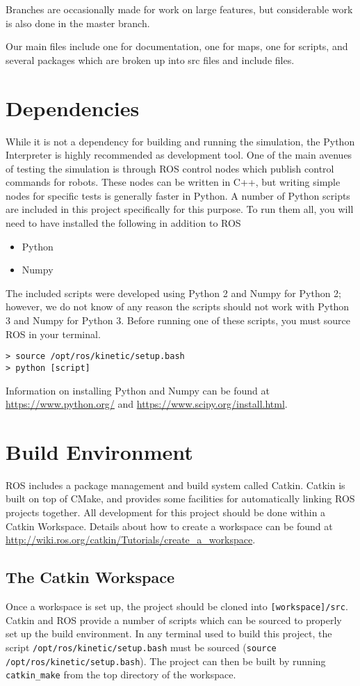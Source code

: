 Branches are occasionally made for work on large features, but considerable work is also done in the master branch.

Our main files include one for documentation, one for maps, one for scripts, and several packages which are broken up into src files and include files.

\section{Dependencies}
While it is not a dependency for building and running the simulation, the Python Interpreter is highly recommended as development tool. One of the main avenues of testing the simulation is through ROS control nodes which publish control commands for robots. These nodes can be written in C++, but writing simple nodes for specific tests is generally faster in Python. A number of Python scripts are included in this project specifically for this purpose. To run them all, you will need to have installed the following in addition to ROS
\begin{itemize}
	\item Python
	\item Numpy
\end{itemize}
The included scripts were developed using Python 2 and Numpy for Python 2; however, we do not know of any reason the scripts should not work with Python 3 and Numpy for Python 3.
Before running one of these scripts, you must source ROS in your terminal.
\begin{lstlisting}
> source /opt/ros/kinetic/setup.bash
> python [script]
\end{lstlisting}

Information on installing Python and Numpy can be found at \url{https://www.python.org/} and \url{https://www.scipy.org/install.html}.

\section{Build  Environment} \label{sec:buildenv}
ROS includes a package management and build system called Catkin. Catkin is built on top of CMake, and provides some facilities for automatically linking ROS projects together.
All development for this project should be done within a Catkin Workspace. Details about how to create a workspace can be found at \url{http://wiki.ros.org/catkin/Tutorials/create_a_workspace}. 

\subsection{The Catkin Workspace}
Once a workspace is set up, the project should be cloned into \lstinline|[workspace]/src|.
Catkin and ROS provide a number of scripts which can be sourced to properly set up the build environment. In any terminal used to build this project, the script \lstinline|/opt/ros/kinetic/setup.bash| must be sourced (\lstinline|source /opt/ros/kinetic/setup.bash|). The project can then be built by running \lstinline|catkin_make| from the top directory of the workspace.

